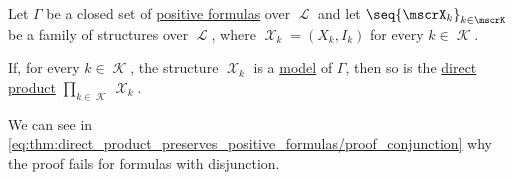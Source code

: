 \begin{proposition}\label{thm:direct_product_preserves_positive_formulas}
  Let \( \Gamma \) be a closed set of \hyperref[def:positive_formula]{positive formulas}  over \( \mscrL \) and let \( \seq{ \mscrX_k }_{k \in \mscrK} \) be a family of structures over \( \mscrL \), where \( \mscrX_k = (X_k, I_k) \) for every \( k \in \mscrK \).

  If, for every \( k \in \mscrK \), the structure \( \mscrX_k \) is a \hyperref[def:first_order_model]{model} of \( \Gamma \), then so is the \hyperref[def:first_order_direct_product]{direct product} \( \prod_{k \in \mscrK} \mscrX_k \).
\end{proposition}
\begin{comments}
  \item We can see in \eqref{eq:thm:direct_product_preserves_positive_formulas/proof_conjunction} why the proof fails for formulas with disjunction.
\end{comments}

